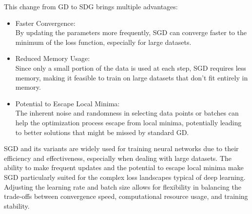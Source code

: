 \documentclass[journal]{IEEEtran}
\begin{document}
This change from GD to SDG brings multiple advantages:
\begin{itemize}
    \item Faster Convergence: \\
    By updating the parameters more frequently, SGD can converge faster to the minimum of the loss function, especially for large datasets.
    \item Reduced Memory Usage: \\
    Since only a small portion of the data is used at each step, SGD requires less memory, making it feasible to train on large datasets that don't fit entirely in memory.
    \item Potential to Escape Local Minima: \\
    The inherent noise and randomness in selecting data points or batches can help the optimization process escape from local minima, potentially leading to better solutions that might be missed by standard GD.
\end{itemize}
SGD and its variants are widely used for training neural networks due to their efficiency and effectiveness, especially when dealing with large datasets. The ability to make frequent updates and the potential to escape local minima make SGD particularly suited for the complex loss landscapes typical of deep learning. Adjusting the learning rate and batch size allows for flexibility in balancing the trade-offs between convergence speed, computational resource usage, and training stability.
\end{document}
